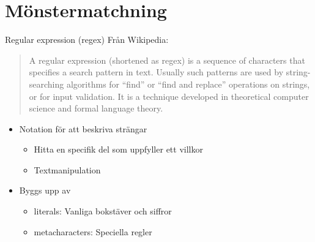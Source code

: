 \documentclass[
  11pt,
  ignorenonframetext,
  handout]{beamer}
\providecommand{\tightlist}{%
  \setlength{\itemsep}{0pt}\setlength{\parskip}{0pt}}
\begin{document}
\hypertarget{muxf6nstermatchning}{%
\section{Mönstermatchning}\label{muxf6nstermatchning}}

\begin{frame}{Regular expression (regex)}
\protect\hypertarget{regular-expression-regex}{}
Från Wikipedia:

\begin{quote}
A regular expression (shortened as regex) is a sequence of characters
that specifies a search pattern in text. Usually such patterns are used
by string-searching algorithms for ``find'' or ``find and replace''
operations on strings, or for input validation. It is a technique
developed in theoretical computer science and formal language theory.
\end{quote}

\begin{itemize}
\tightlist
\item
  Notation för att beskriva strängar

  \begin{itemize}
  \tightlist
  \item
    Hitta en specifik del som uppfyller ett villkor
  \item
    Textmanipulation
  \end{itemize}
\item
  Byggs upp av

  \begin{itemize}
  \tightlist
  \item
    literals: Vanliga bokstäver och siffror
  \item
    metacharacters: Speciella regler
  \end{itemize}
\end{itemize}
\end{frame}
\end{document}
